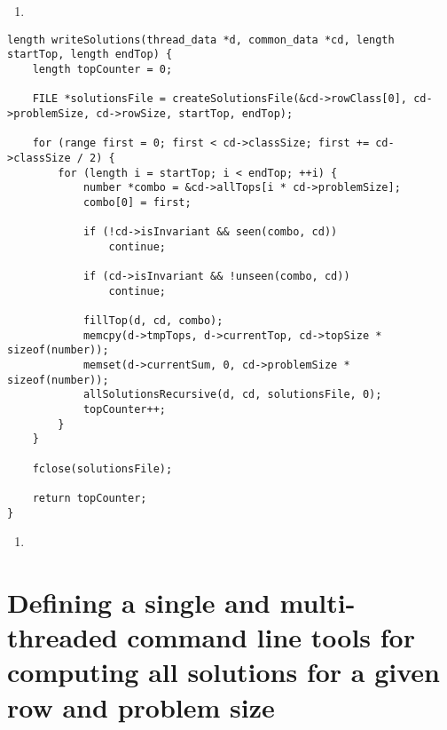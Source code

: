 \begin{enumerate}
\addtocounter{enumi}{1}
\item 
\end{enumerate}

\begin{lstlisting}[caption={Writing a text file with all solutions for a row class within a range of tops.},label={writeSolutions}]
length writeSolutions(thread_data *d, common_data *cd, length startTop, length endTop) {
    length topCounter = 0;

    FILE *solutionsFile = createSolutionsFile(&cd->rowClass[0], cd->problemSize, cd->rowSize, startTop, endTop);

    for (range first = 0; first < cd->classSize; first += cd->classSize / 2) {
        for (length i = startTop; i < endTop; ++i) {
            number *combo = &cd->allTops[i * cd->problemSize];
            combo[0] = first;

            if (!cd->isInvariant && seen(combo, cd))
                continue;

            if (cd->isInvariant && !unseen(combo, cd))
                continue;

            fillTop(d, cd, combo);
            memcpy(d->tmpTops, d->currentTop, cd->topSize * sizeof(number));
            memset(d->currentSum, 0, cd->problemSize * sizeof(number));
            allSolutionsRecursive(d, cd, solutionsFile, 0);
            topCounter++;
        }
    }

    fclose(solutionsFile);

    return topCounter;
}
\end{lstlisting}

\begin{enumerate}
\addtocounter{enumi}{1}
\item 
\end{enumerate}

\section{Defining a single and multi-threaded command line tools for computing all solutions for a given row and problem size}
